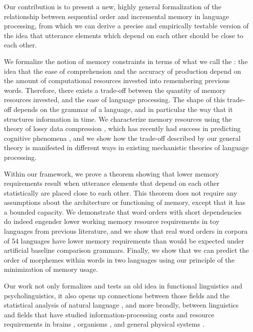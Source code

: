 Our contribution is to present a new, highly general formalization of the relationship between sequential order and incremental memory in language processing, from which we can derive a precise and empirically testable version of the idea that utterance elements which depend on each other should be close to each other. 

We formalize the notion of memory constraints in terms of what we call the : the idea that the ease of comprehension and the accuracy of production depend on the amount of computational resources invested into remembering previous words.
Therefore, there exists a trade-off between the quantity of memory resources invested, and the ease of language processing.
The shape of this trade-off depends on the grammar of a language, and in particular the way that it structures information in time.
We characterize memory resources using the theory of lossy data compression \citep{cover2006elements,berger2003rate}, which has recently had success in predicting cognitive phenomena \citep{sims2018efficient,gershman} , and we show how the trade-off described by our general theory is manifested in different ways in existing mechanistic theories of language processing. 

Within our framework, we prove a theorem showing that lower memory requirements result when utterance elements that depend on each other statistically are placed close to each other. This theorem does not require any assumptions about the architecture or functioning of memory, except that it has a bounded capacity. We demonstrate that word orders with short dependencies do indeed engender lower working memory resource requirements in toy languages from previous literature, and we show that real word orders in corpora of 54 languages have lower memory requirements than would be expected under artificial baseline comparison grammars. Finally, we show that we can predict the order of morphemes within words in two languages using our principle of the minimization of memory usage.

Our work not only formalizes and tests an old idea in functional linguistics and psycholinguistics, it also opens up connections between those fields and the statistical analysis of natural language \citep{debowski-excess-2011,bentz2017word,lin-critical-2017}, and more broadly, between linguistics and fields that have studied information-processing costs and resource requirements in brains \citep{friston2010free}, organisms \citep{england} , and general physical systems \citep{still2012thermodynamic}. 





